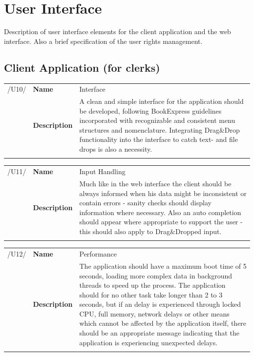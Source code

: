 \documentclass[11pt,a4paper,oneside,svgnames]{report}
\begin{document}
\chapter{User Interface}
Description of user interface elements for the client application and the web interface. Also a brief specification of the user rights management.

\section{Client Application (for clerks)}
\noindent
\begin{tabular}{llp{8.75cm}}
\cellcolor{white}/U10/	& \textbf{Name}			& Interface\\
\cellcolor{white}		& \textbf{Description}	& A clean and simple interface for the application should be developed, following BookExpress guidelines incorporated with recognizable and consistent menu structures and nomenclature. Integrating Drag\&Drop functionality into the interface to catch text- and file drops is also a necessity.\\
\cellcolor{white}		\hfill \\
\end{tabular}

\noindent
\begin{tabular}{llp{8.75cm}}
\cellcolor{white}/U11/	& \textbf{Name}			& Input Handling\\
\cellcolor{white}		& \textbf{Description}	& Much like in the web interface the client should be always informed when his data might be inconsistent or contain errors - sanity checks should display information where necessary. Also an auto completion should appear where appropriate to support the user - this should also apply to Drag\&Dropped input.\\
\cellcolor{white}		\hfill \\
\end{tabular}

\noindent
\begin{tabular}{llp{8.75cm}}
\cellcolor{white}/U12/	& \textbf{Name}			& Performance\\
\cellcolor{white}		& \textbf{Description}	& The application should have a maximum boot time of 5 seconds, loading more complex data in background threads to speed up the process. The application should for no other task take longer than 2 to 3 seconds, but if an delay is experienced through locked CPU, full memory, network delays or other means which cannot be affected by the application itself, there should be an appropriate message indicating that the application is experiencing unexpected delays.\\
\cellcolor{white}		\hfill \\
\end{tabular}
\end{document}
